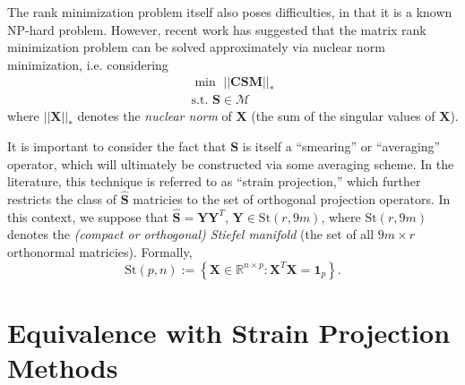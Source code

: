 \documentclass[12pt]{article}
\begin{document}
The rank minimization problem itself also poses difficulties, in that it is a known NP-hard problem. However, recent work \cite{recht2010} has suggested that the matrix rank minimization problem can be solved approximately via nuclear norm minimization, i.e. considering
\begin{eqnarray}
	\min \, \, || \mathbf{C} \mathbf{S} \mathbf{M} ||_*  \nonumber \\
	\mbox{s.t.} \, \, \mathbf{S} \in \mathcal{M}
\end{eqnarray}
where $|| \mathbf{X} ||_*$ denotes the \textit{nuclear norm} of $\mathbf{X}$ (the sum of the singular values of $\mathbf{X}$).

It is important to consider the fact that $\mathbf{S}$ is itself a ``smearing'' or ``averaging'' operator, which will ultimately be constructed via some averaging scheme. In the literature, this technique is referred to as ``strain projection,'' which further restricts the class of $\hat{\mathbf{S}}$ matricies to the set of orthogonal projection operators. In this context, we suppose that $\hat{\mathbf{S}} = \mathbf{Y} \mathbf{Y}^T$, $\mathbf{Y} \in \mbox{St} ( r, 9m )$, where $\mbox{St} ( r, 9m )$ denotes the \textit{(compact or orthogonal) Stiefel manifold} (the set of all $9m \times r$ orthonormal matricies). Formally,
\begin{equation}
	\mbox{St} (p, n) := \left\{ \mathbf{X} \in \mathbb{R}^{n \times p} : \mathbf{X}^T \mathbf{X} = \mathbf{1}_p \right\}.
\end{equation}

\newpage

\section{Equivalence with Strain Projection Methods}
\end{document}
